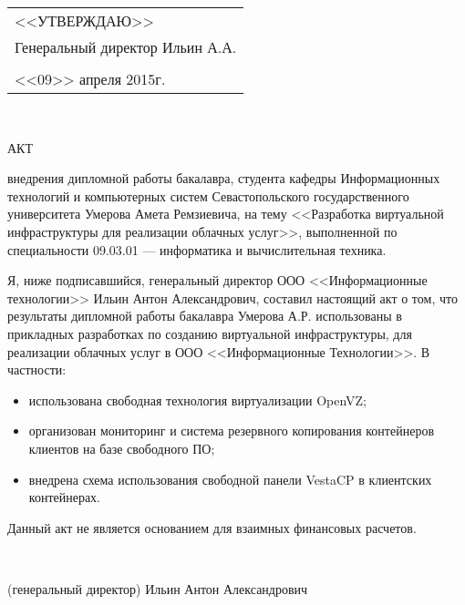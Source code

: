 \begin{flushright}
\begin{tabular}{p{}}
\MakeTextUppercase{<<Утверждаю>>} \\
Генеральный директор Ильин А.А. \\
\thispagestyle{empty}

\hrulefill \\
<<09>> апреля 2015г.
\end{tabular}
\end{flushright}

{~}\bigskip

\begin{center}
\MakeTextUppercase{Акт}
\end{center}
внедрения дипломной работы бакалавра, студента кафедры Информационных технологий и компьютерных систем
Севастопольского государственного университета Умерова Амета Ремзиевича, на тему <<Разработка виртуальной инфраструктуры для реализации облачных услуг>>, выполненной по специальности 09.03.01 --- информатика и вычислительная техника.

Я, ниже подписавшийся, генеральный директор ООО <<Информационные технологии>> Ильин Антон Александрович, 
составил настоящий акт о том, что результаты дипломной работы бакалавра Умерова А.Р. 
использованы в прикладных разработках по созданию виртуальной инфраструктуры, для реализации облачных услуг в ООО <<Информационные Технологии>>.
В частности:
\begin{itemize}
    \item использована свободная технология виртуализации OpenVZ;
    \item организован мониторинг и система резервного копирования контейнеров клиентов на базе свободного ПО;
    \item внедрена схема использования свободной панели VestaCP в клиентских контейнерах.
\end{itemize}

Данный акт не является основанием для взаимных финансовых расчетов.

{~}\bigskip{~}\bigskip{~}\bigskip

(генеральный директор) \hspace{10em} Ильин Антон Александрович

\clearpage
